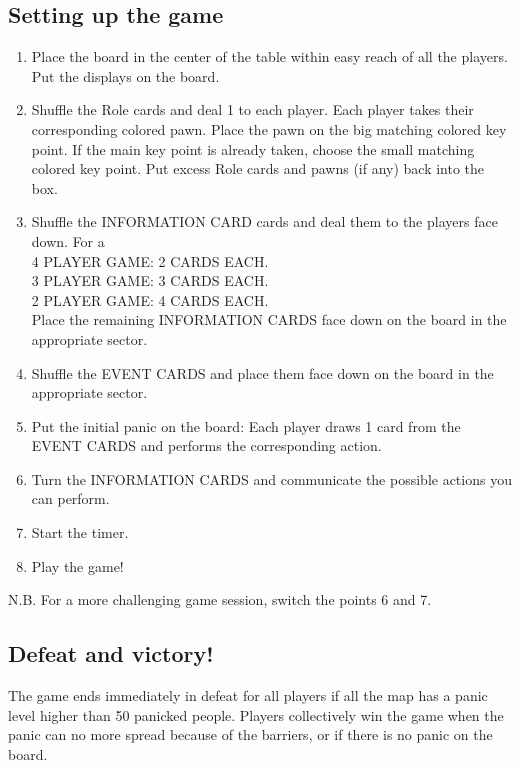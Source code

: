\subsection*{Setting up the game}
\begin{enumerate}
	\item Place the board in the center of the table within easy reach of all the players. Put the displays on the board.
	\item Shuffle the Role cards and deal 1 to each player. Each player takes their corresponding colored pawn. Place the pawn on the big matching colored key point. If the main key point is already taken, choose the small matching colored key point. Put excess Role cards and pawns (if any) back into the box.
	\item Shuffle the INFORMATION CARD cards and deal them to the players face down. For a \\4 PLAYER GAME: 2 CARDS EACH.  \\3 PLAYER GAME: 3 CARDS EACH. \\2 PLAYER GAME: 4 CARDS EACH. \\Place the remaining INFORMATION CARDS face down on the board in the appropriate sector. 	
	\item Shuffle the EVENT CARDS and place them face down on the board in the 	appropriate sector.
	\item Put the initial panic on the board: Each player draws 1 card from the EVENT CARDS and performs the corresponding action.
	\item Turn the INFORMATION CARDS and communicate the possible actions you can perform.
	\item Start the timer.
	\item Play the game! 	
\end{enumerate}

N.B. For a more challenging game session, switch the points 6 and 7. \\
%
\subsection*{Defeat and victory!}
The game ends immediately in defeat for all players if all the map has a panic level higher than 50 panicked people. Players collectively win the game when the panic can no more spread because of the barriers, or if there is no panic on the board.

